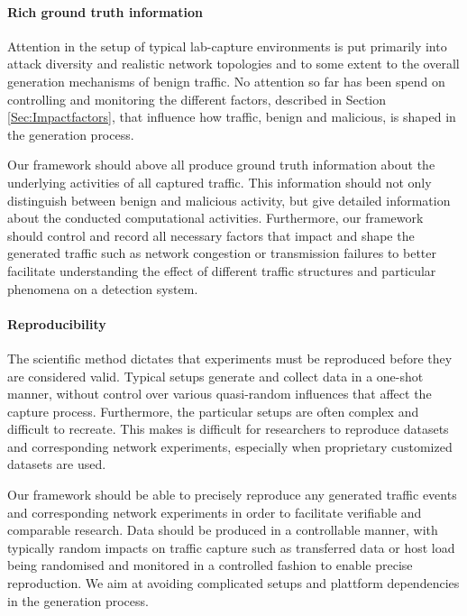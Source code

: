 \documentclass{article}
\begin{document}
\paragraph{Rich ground truth information} Attention in the setup of typical lab-capture environments is put primarily into attack diversity and realistic network topologies and to some extent to the overall generation mechanisms of benign traffic. No attention so far has been spend on controlling and monitoring the different factors, described in Section \ref{Sec:Impactfactors}, that influence how traffic, benign and malicious, is shaped in the generation process. 

Our framework should above all produce ground truth information about the underlying activities of all captured traffic. This information should not only distinguish between benign and malicious activity, but give detailed information about the conducted computational activities. Furthermore, our framework should control and record all necessary factors that impact and shape the generated traffic such as network congestion or transmission failures to better facilitate understanding the effect of different traffic structures and particular phenomena on a detection system.


\paragraph{Reproducibility} The scientific method dictates that experiments must be reproduced  before  they  are  considered  valid. Typical setups generate and collect data in a one-shot manner, without control over various quasi-random influences that affect the capture process. Furthermore, the particular setups are often complex and difficult to recreate. This makes is difficult for researchers to reproduce datasets and corresponding network experiments, especially when proprietary customized datasets are used. 

Our framework should be able to precisely reproduce any generated traffic events and corresponding network experiments in order to facilitate verifiable and comparable research. Data should be produced in a controllable manner, with typically random impacts on traffic capture such as transferred data or host load being randomised and monitored in a controlled fashion to enable precise reproduction. We aim at avoiding complicated setups and plattform dependencies in the generation process. 
\end{document}
